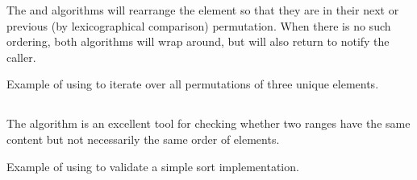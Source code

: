 The  and  algorithms will rearrange the element so that they are in their next or previous (by lexicographical comparison) permutation. When there is no such ordering, both algorithms will wrap around, but will also return  to notify the caller.


\begin{box-note}
\footnotesize Example of using  to iterate over all permutations of three unique elements.
\tcblower
{}
\end{box-note}

\subsection{\texorpdfstring{}{\texttt{std::is\_permutation}}}

The  algorithm is an excellent tool for checking whether two ranges have the same content but not necessarily the same order of elements.


\begin{box-note}
\footnotesize Example of using  to validate a simple sort implementation.
\tcblower
{}
\end{box-note}
